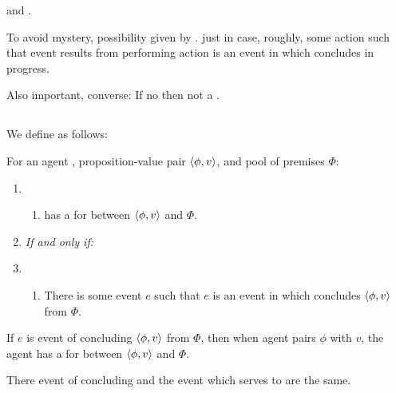 \begin{note}
  \supportI{} and \supportII{}.

  To avoid mystery, possibility given by .
  \fc{} just in case, roughly, some action such that event results from performing action is an event in which concludes in progress.
\end{note}

\begin{note}
  Also important, converse: If no \ros{} then not a \fc{}.
\end{note}

\subsection{}

\begin{note}
  We define \witness{} as follows:

  \begin{definition}[A \witness{2}]
    \label{def:witnessing}
    For an agent \vAgent{}, proposition-value pair \(\langle \phi, v \rangle\), and pool of premises \(\Phi\):

    \begin{enumerate}[label=]
    \item
      \begin{enumerate}[label=\alph*., ref=(\alph*), series=WitnessDef]
      \item
        \vAgent{} has a \emph{} for \ros{} between \(\langle \phi, v \rangle\) and \(\Phi\).
      \end{enumerate}
    \item
      \emph{If and only if:}
    \item
      \begin{enumerate}[label=\alph*., ref=(\alph*), resume*=WitnessDef]
      \item
        There is some event \(e\) such that \(e\) is an event in which \vAgent{} concludes \(\langle \phi, v \rangle\) from \(\Phi\).
      \end{enumerate}
    \end{enumerate}
    \vspace{-\baselineskip}
  \end{definition}

  If \(e\) is event of concluding \(\langle \phi, v \rangle\) from \(\Phi\), then when agent pairs \(\phi\) with \(v\), the agent has a \witness{} for \ros{} between \(\langle \phi, v \rangle\) and \(\Phi\).

  There event of concluding and the event which serves to \witness{} are the same.
\end{note}

